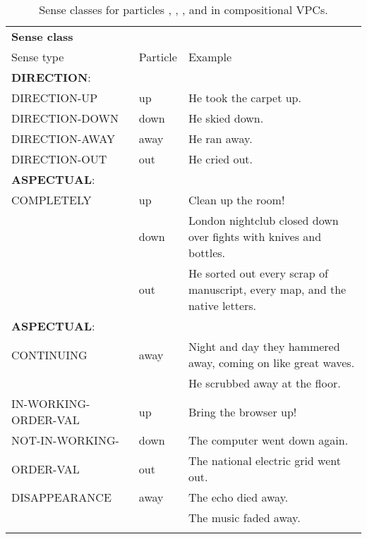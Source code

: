 \documentclass[output=paper,modfonts,nonflat]{langsci/langscibook}
\begin{document}
 
\begin{table}%
\caption{Sense classes for particles , , , and  in compositional VPCs.}
\label{tab:1:senseclasses-prtcls}
\footnotesize
\begin{tabularx}{\textwidth}{llQ}
  \lsptoprule
  \textbf{Sense class}\\
  Sense type & Particle & Example \\\midrule
 
    \textbf{DIRECTION}: & & \\
    DIRECTION-UP & up & He took the carpet up. \\
    DIRECTION-DOWN & down & He skied down. \\
    DIRECTION-AWAY & away & He ran away. \\
    DIRECTION-OUT & out & He cried out.\\

\tablevspace
    \textbf{ASPECTUAL}: & & \\
    COMPLETELY & up & Clean up the room! \\
                        & down & London nightclub closed down over fights with knives and bottles. \\
                        & out & He sorted out every scrap of manuscript, every map, and the native letters.  \\
   
\tablevspace
    \textbf{ASPECTUAL}: & & \\
    CONTINUING & away & Night and day they hammered away, coming on like great waves. \\
                         &      & He scrubbed away at the floor.\\

    IN-WORKING-ORDER-VAL & up & Bring the browser up!  \\

    NOT-IN-WORKING-  & down & The computer went down again. \\
    ORDER-VAL       & out & The national electric grid went out. \\

    DISAPPEARANCE & away & The echo died away. \\
                           &      & The music faded away. \\
\lspbottomrule
 \end{tabularx}

\end{table} 
\end{document}
